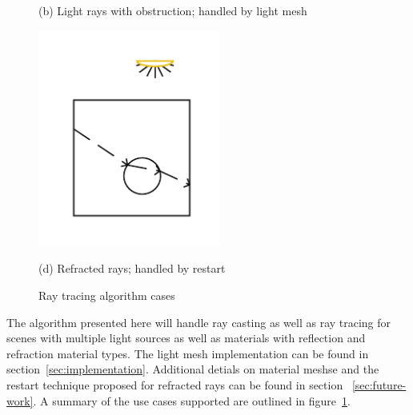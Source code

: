 \begin{figure}[!htb]
  (b) Light rays with obstruction; handled by light mesh
  
  \includegraphics[width=6cm]{drawings/Case_4.pdf}
  
  (d) Refracted rays; handled by restart
  
\endminipage
\caption{Ray tracing algorithm cases}
\label{fig:use-cases}
\end{figure}

The algorithm presented here will handle ray casting as well as ray tracing for
scenes with multiple light sources as well as materials with reflection and
refraction material types.  The light mesh implementation can be found in 
section~\ref{sec:implementation}.  Additional detials on material meshse and the 
restart technique proposed for refracted rays can be found in section
~\ref{sec:future-work}.  A summary of the use cases supported are outlined in
figure~\ref{fig:use-cases}.
















